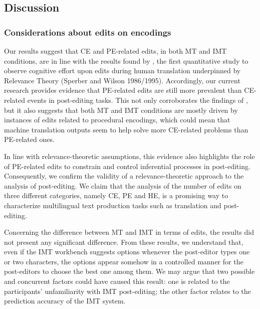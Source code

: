 \documentclass[output=paper]{langsci/langscibook}
\begin{document}
\subsection{Discussion}

\subsubsection{Considerations about edits on encodings}

Our results suggest that CE and PE-related edits, in both MT and IMT conditions, are in line with the results found by \citet{alves2013}, the first quantitative study to observe cognitive effort upon edits during human translation underpinned by Relevance Theory (Sperber and Wilson 1986/1995). Accordingly, our current research provides evidence that PE-related edits are still more prevalent than CE-related events in post-editing tasks. This not only corroborates the findings of \citet{alves2013}, but it also suggests that both MT and IMT conditions are mostly driven by instances of edits related to procedural encodings, which could mean that machine translation outputs seem to help solve more CE-related problems than PE-related ones.



In line with relevance-theoretic assumptions, this evidence also highlights the role of PE-related edits to constrain and control inferential processes in post-editing.  Consequently, we confirm the validity of a relevance-theoretic approach to the analysis of post-editing. We claim that the analysis of the number of edits on three different categories, namely CE, PE and HE, is a promising way to characterize multilingual text production tasks such as translation and post-editing.  



Concerning the difference between MT and IMT in terms of edits, the results did not present any significant difference.  From these results, we understand that, even if the IMT workbench suggests options whenever the post-editor types one or two characters, the options appear somehow in a controlled manner for the post-editors to choose the best one among them. We may argue that two possible and concurrent factors could have caused this result: one is related to the participants’ unfamiliarity with IMT post-editing; the other factor relates to the prediction accuracy of the IMT system.  
\end{document}
